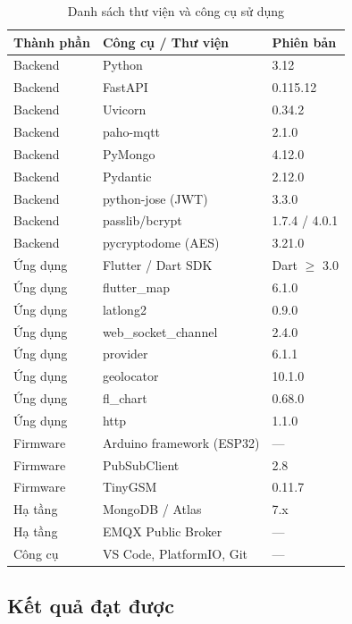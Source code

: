 \documentclass[../DoAn.tex]{subfiles}
\begin{document}
    \begin{table}[H]
    \centering
    \caption{Danh sách thư viện và công cụ sử dụng}
    \label{table:congcu}
    \begin{tabular}{|l|l|l|}
    \hline
    \textbf{Thành phần} & \textbf{Công cụ / Thư viện} & \textbf{Phiên bản} \\ \hline
    Backend & Python & 3.12 \\ \hline
    Backend & FastAPI & 0.115.12 \\ \hline
    Backend & Uvicorn & 0.34.2 \\ \hline
    Backend & paho-mqtt & 2.1.0 \\ \hline
    Backend & PyMongo & 4.12.0 \\ \hline
    Backend & Pydantic & 2.12.0 \\ \hline
    Backend & python-jose (JWT) & 3.3.0 \\ \hline
    Backend & passlib/bcrypt & 1.7.4 / 4.0.1 \\ \hline
    Backend & pycryptodome (AES) & 3.21.0 \\ \hline
    Ứng dụng & Flutter / Dart SDK & Dart $\geq$ 3.0 \\ \hline
    Ứng dụng & flutter\_map & 6.1.0 \\ \hline
    Ứng dụng & latlong2 & 0.9.0 \\ \hline
    Ứng dụng & web\_socket\_channel & 2.4.0 \\ \hline
    Ứng dụng & provider & 6.1.1 \\ \hline
    Ứng dụng & geolocator & 10.1.0 \\ \hline
    Ứng dụng & fl\_chart & 0.68.0 \\ \hline
    Ứng dụng & http & 1.1.0 \\ \hline
    Firmware & Arduino framework (ESP32) & --- \\ \hline
    Firmware & PubSubClient & 2.8 \\ \hline
    Firmware & TinyGSM & 0.11.7 \\ \hline
    Hạ tầng & MongoDB / Atlas & 7.x \\ \hline
    Hạ tầng & EMQX Public Broker & --- \\ \hline
    Công cụ & VS Code, PlatformIO, Git & --- \\ \hline
    \end{tabular}
    \end{table}

    \subsection{Kết quả đạt được}
\end{document}
